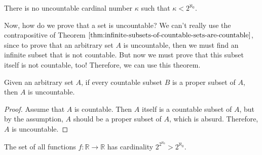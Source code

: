   \begin{theorem}
    \label{thm:continuum-hypothesis}
    There is no uncountable cardinal number $\kappa$ such that $\kappa < 2^{\aleph_0}$. 
  \end{theorem}

  Now, how do we prove that a set is uncountable? We can't really use the contrapositive of Theorem $\ref{thm:infinite-subsets-of-countable-sets-are-countable}$, since to prove that an arbitrary set $A$ is uncountable, then we must find an infinite subset that is not countable. But now we must prove that this subset itself is not countable, too! Therefore, we can use this theorem. 

  \begin{theorem}
    \label{thm:characterization-of-uncountable-sets}
    Given an arbitrary set $A$, if every countable subset $B$ is a proper subset of $A$, then $A$ is uncountable. 
  \end{theorem}
  \begin{proof}
    Assume that $A$ is countable. Then $A$ itself is a countable subset of $A$, but by the assumption, $A$ should be a proper subset of $A$, which is absurd. Therefore, $A$ is uncountable. 
  \end{proof}

  \begin{theorem}
    \label{thm:cardinality-of-the-set-of-real-functions}
    The set of all functions $f: \mathbb{R} \to \mathbb{R}$ has cardinality $2^{2^{\aleph_0}} > 2^{\aleph_0}$. 
  \end{theorem}
